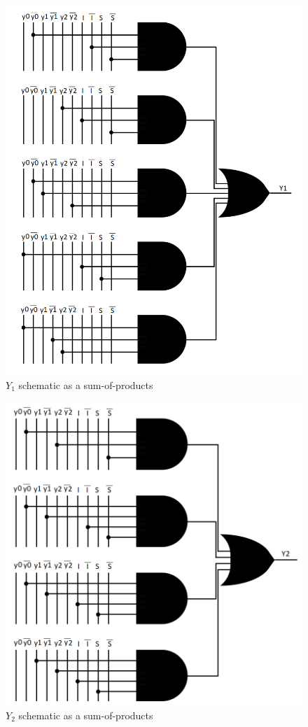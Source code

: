 \documentclass[../../e3_tp3_main.tex]{subfiles}
\begin{document}
\begin{figure}[H]
	\centering
	\includegraphics{figures/moore_Y1_schem.PNG}
	\caption{$Y_1$ schematic as a sum-of-products}
	\label{fig:ej1_moore_Y1_schem}
\end{figure}
\begin{figure}[H]
	\centering
	\includegraphics{figures/moore_Y2_schem.PNG}
	\caption{$Y_2$ schematic as a sum-of-products}
	\label{fig:ej1_moore_Y2_schem}
\end{figure}
\end{document}
